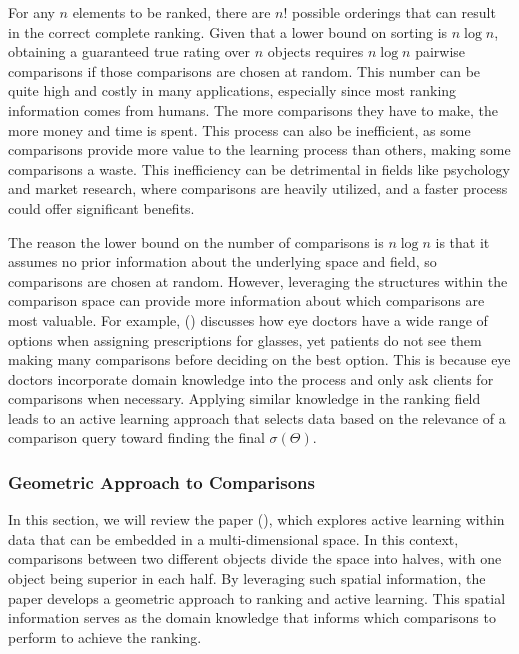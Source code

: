 \documentclass[
  letterpaper,
  numbers=noenddot,
  DIV=11]{scrreprt}
\theoremstyle{definition}
\theoremstyle{plain}
\theoremstyle{plain}
\theoremstyle{remark}
\begin{document}
For any \(n\) elements to be ranked, there are \(n!\) possible orderings
that can result in the correct complete ranking. Given that a lower
bound on sorting is \(n\log n\), obtaining a guaranteed true rating over
\(n\) objects requires \(n\log n\) pairwise comparisons if those
comparisons are chosen at random. This number can be quite high and
costly in many applications, especially since most ranking information
comes from humans. The more comparisons they have to make, the more
money and time is spent. This process can also be inefficient, as some
comparisons provide more value to the learning process than others,
making some comparisons a waste. This inefficiency can be detrimental in
fields like psychology and market research, where comparisons are
heavily utilized, and a faster process could offer significant benefits.

The reason the lower bound on the number of comparisons is \(n\log n\)
is that it assumes no prior information about the underlying space and
field, so comparisons are chosen at random. However, leveraging the
structures within the comparison space can provide more information
about which comparisons are most valuable. For example,
() discusses how eye doctors
have a wide range of options when assigning prescriptions for glasses,
yet patients do not see them making many comparisons before deciding on
the best option. This is because eye doctors incorporate domain
knowledge into the process and only ask clients for comparisons when
necessary. Applying similar knowledge in the ranking field leads to an
active learning approach that selects data based on the relevance of a
comparison query toward finding the final \(\sigma(\Theta)\).

\subsubsection*{Geometric Approach to
Comparisons}\label{geometric-approach-to-comparisons}

In this section, we will review the paper (), which explores active learning within data that can be
embedded in a multi-dimensional space. In this context, comparisons
between two different objects divide the space into halves, with one
object being superior in each half. By leveraging such spatial
information, the paper develops a geometric approach to ranking and
active learning. This spatial information serves as the domain knowledge
that informs which comparisons to perform to achieve the ranking.
\end{document}
